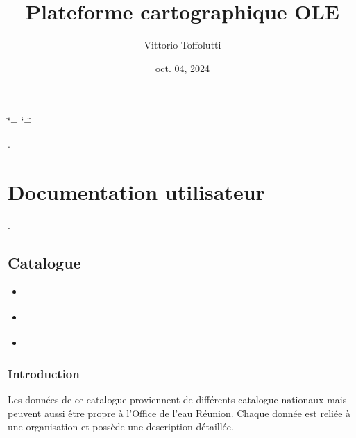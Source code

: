 \documentclass[letterpaper,10pt,french]{sphinxmanual}
\title{Plateforme cartographique OLE}
\date{oct. 04, 2024}
\author{Vittorio Toffolutti}
\begin{document}
\ifdefined\shorthandoff
  \ifnum\catcode`\=\string=\active\shorthandoff{=}\fi
  \ifnum\catcode`\"=\active{}\fi
\fi

\pagestyle{empty}
\sphinxmaketitle
\pagestyle{plain}
\sphinxtableofcontents
\pagestyle{normal}
\label{\detokenize{index::doc}}


\sphinxAtStartPar
{}.

\sphinxstepscope


\chapter{Documentation utilisateur}
\label{\detokenize{doc_user:documentation-utilisateur}}\label{\detokenize{doc_user::doc}}
\sphinxAtStartPar
{}.

\sphinxstepscope


\section{Catalogue}
\label{\detokenize{doc_user/catalogue:catalogue}}\label{\detokenize{doc_user/catalogue::doc}}
\begin{sphinxShadowBox}
\begin{itemize}
\item {} 
\sphinxAtStartPar
{}\label{\detokenize{doc_user/catalogue:id1}}{\hyperref[\detokenize{doc_user/catalogue:introduction}]{}}

\item {} 
\sphinxAtStartPar
{}\label{\detokenize{doc_user/catalogue:id2}}{\hyperref[\detokenize{doc_user/catalogue:la-recherche-des-donnees-dans-le-catalogue}]{}}

\item {} 
\sphinxAtStartPar
{}\label{\detokenize{doc_user/catalogue:id3}}{\hyperref[\detokenize{doc_user/catalogue:les-fonctionnalites-des-fiches-de-donnees}]{}}

\end{itemize}
\end{sphinxShadowBox}


\subsection{Introduction}
\label{\detokenize{doc_user/catalogue:introduction}}
\sphinxAtStartPar
Les données de ce catalogue proviennent de différents catalogue nationaux mais peuvent aussi être propre à l’Office de l’eau Réunion.
Chaque donnée est reliée à une organisation et possède une description détaillée.
\end{document}
